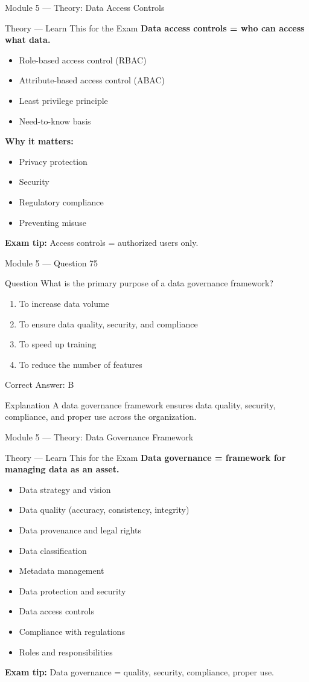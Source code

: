 \documentclass[aspectratio=169,10pt]{beamer}
\newcommand{\question}[1]{%
	\begin{block}{Question}
		#1
	\end{block}
}
\newcommand{\options}[4]{%
	\begin{enumerate}[label=\Alph*.,leftmargin=*]
		\item #1
		\item #2
		\item #3
		\item #4
	\end{enumerate}
}
\newcommand{\answerbox}[1]{%
	\begin{exampleblock}{Correct Answer: #1}
	\end{exampleblock}
}
\newcommand{\explain}[1]{%
	\begin{block}{Explanation}
		\small #1
	\end{block}
}
\newcommand{\theory}[1]{%
	\begin{block}{Theory --- Learn This for the Exam}
		\small #1
	\end{block}
}
\begin{document}
	\begin{frame}{Module 5 --- Theory: Data Access Controls}
		\theory{
			\textbf{Data access controls = who can access what data.}
			\begin{itemize}
				\item Role-based access control (RBAC)
				\item Attribute-based access control (ABAC)
				\item Least privilege principle
				\item Need-to-know basis
			\end{itemize}
			\textbf{Why it matters:}
			\begin{itemize}
				\item Privacy protection
				\item Security
				\item Regulatory compliance
				\item Preventing misuse
			\end{itemize}
			\textbf{Exam tip:} Access controls = authorized users only.
		}
	\end{frame}
	
	\begin{frame}{Module 5 --- Question 75}
		\question{What is the primary purpose of a data governance framework?}
		\options{To increase data volume}{To ensure data quality, security, and compliance}{To speed up training}{To reduce the number of features}
		\answerbox{B}
		\explain{A data governance framework ensures data quality, security, compliance, and proper use across the organization.}
	\end{frame}
	
	\begin{frame}{Module 5 --- Theory: Data Governance Framework}
		\theory{
			\textbf{Data governance = framework for managing data as an asset.}
			\begin{itemize}
				\item Data strategy and vision
				\item Data quality (accuracy, consistency, integrity)
				\item Data provenance and legal rights
				\item Data classification
				\item Metadata management
				\item Data protection and security
				\item Data access controls
				\item Compliance with regulations
				\item Roles and responsibilities
			\end{itemize}
			\textbf{Exam tip:} Data governance = quality, security, compliance, proper use.
		}
	\end{frame}
	
\end{document}
